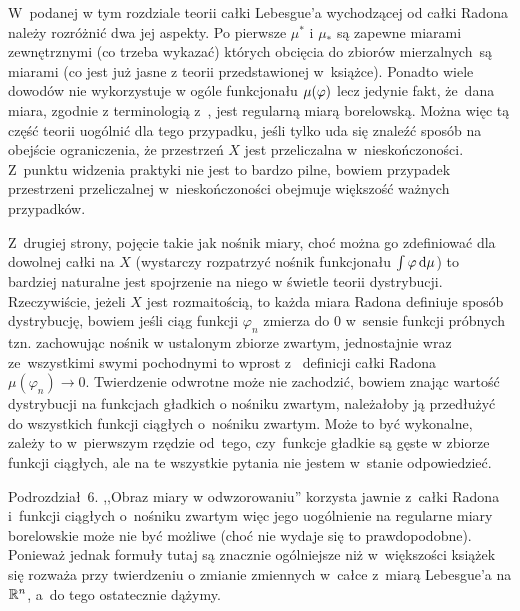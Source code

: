 \documentclass[a4paper,11pt]{article}
\begin{document}
\vspace{\spaceThree}

\start W~podanej w tym rozdziale teorii całki Lebesgue'a wychodzącej
od całki Radona należy rozróżnić dwa jej aspekty. Po pierwsze
$\mu^{ * }$ i $\mu_{ * }$ są zapewne miarami zewnętrznymi (co trzeba
wykazać) których obcięcia do zbiorów mierzalnych~są miarami (co jest
już jasne z teorii przedstawionej w~książce). Ponadto wiele dowodów
nie wykorzystuje w ogóle funkcjonału $\mu( \varphi )$ lecz jedynie fakt,
że~dana miara, zgodnie z terminologią z~\cite{Rud86}, jest regularną
miarą borelowską. Można więc tą część teorii uogólnić dla tego
przypadku, jeśli tylko uda się znaleźć sposób na obejście
ograniczenia, że przestrzeń $X$ jest przeliczalna w~nieskończoności.
Z~punktu widzenia praktyki nie jest to bardzo pilne, bowiem przypadek
przestrzeni przeliczalnej w~nieskończoności obejmuje większość ważnych
przypadków.

Z~drugiej strony, pojęcie takie jak nośnik miary, choć można go
zdefiniować dla dowolnej całki na $X$ (wystarczy rozpatrzyć nośnik
funkcjonału $\int \varphi \, \mathrm{d} \mu$) to bardziej naturalne jest
spojrzenie na niego w świetle teorii dystrybucji. Rzeczywiście, jeżeli
$X$ jest rozmaitością, to każda miara Radona definiuje sposób
dystrybucję, bowiem jeśli ciąg funkcji $\varphi_{ n }$ zmierza do 0
w~sensie funkcji próbnych tzn. zachowując nośnik w ustalonym zbiorze
zwartym, jednostajnie wraz ze~wszystkimi swymi pochodnymi to wprost z~
definicji całki Radona $\mu( \varphi_{ n } ) \to 0$. Twierdzenie
odwrotne może nie zachodzić, bowiem znając wartość dystrybucji na
funkcjach gładkich o nośniku zwartym, należałoby ją przedłużyć do
wszystkich funkcji ciągłych o~nośniku zwartym. Może to być wykonalne,
zależy to w~pierwszym rzędzie od~tego, czy~funkcje gładkie są gęste w
zbiorze funkcji ciągłych, ale na te wszystkie pytania nie jestem
w~stanie odpowiedzieć.

\vspace{\spaceFour}


\start {} Podrozdział~6. ,,Obraz miary w odwzorowaniu'' korzysta
jawnie z~całki Radona i~funkcji ciągłych o~nośniku zwartym więc jego
uogólnienie na regularne miary borelowskie może nie być możliwe (choć
nie wydaje się to prawdopodobne). Ponieważ jednak formuły tutaj są
znacznie ogólniejsze niż w~większości książek się rozważa przy
twierdzeniu o zmianie zmiennych w~całce z~miarą Lebesgue'a na
$\mathbb{R}^{ n }$, a~do tego ostatecznie dążymy.

\vspace{\spaceFour}
\end{document}

